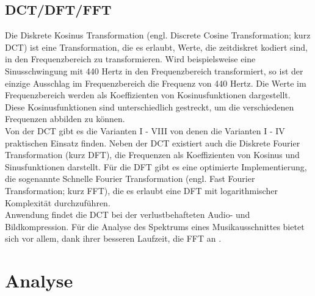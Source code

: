\documentclass[11pt,a4paper]{article}
\begin{document}
\subsection{DCT/DFT/FFT}
Die Diskrete Kosinus Transformation (engl. Discrete Cosine Transformation; kurz DCT) ist eine Transformation, die es erlaubt, Werte, die zeitdiskret kodiert sind, in den Frequenzbereich zu transformieren. Wird beispielsweise eine Sinusschwingung mit 440 Hertz in den Frequenzbereich transformiert, so ist der einzige Ausschlag im Frequenzbereich die Frequenz von 440 Hertz. Die Werte im Frequenzbereich werden als Koeffizienten von Kosinusfunktionen dargestellt. Diese Kosinusfunktionen sind unterschiedlich gestreckt, um die verschiedenen Frequenzen abbilden zu können.\\
Von der DCT gibt es die Varianten I - VIII von denen die Varianten I - IV praktischen Einsatz finden. Neben der DCT existiert auch die Diskrete Fourier Transformation (kurz DFT), die Frequenzen als Koeffizienten von Kosinus und Sinusfunktionen darstellt. Für die DFT gibt es eine optimierte Implementierung, die sogenannte Schnelle Fourier Transformation (engl. Fast Fourier Transformation; kurz FFT), die es erlaubt eine DFT mit logarithmischer Komplexität durchzuführen.\\
Anwendung findet die DCT bei der verlustbehafteten Audio- und Bildkompression. Für die Analyse des Spektrums eines Musikausschnittes bietet sich vor allem, dank ihrer besseren Laufzeit, die FFT an \cite[S. 20 f.]{lerch2012introduction}.



\section{Analyse}
\end{document}
